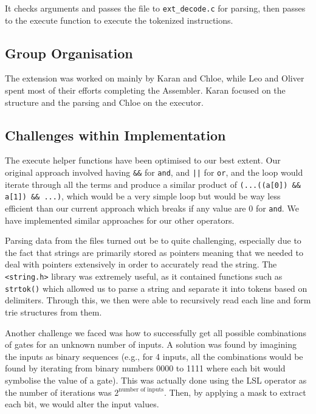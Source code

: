 \documentclass[11pt]{article}
\begin{document}
It checks arguments and passes the file to \texttt{ext\_decode.c} for parsing, then passes to the execute function to execute the tokenized instructions.

\subsection{Group Organisation}

The extension was worked on mainly by Karan and Chloe, while Leo and Oliver spent most of their efforts completing the Assembler. Karan focused on the structure and the parsing and Chloe on the executor.

\subsection{Challenges within Implementation}

The execute helper functions have been optimised to our best extent. Our original approach involved having \texttt{\&\&} for \texttt{and}, and \texttt{||} for \texttt{or}, and the loop would iterate through all the terms and produce a similar product of \texttt{(...((a[0]) \&\& a[1]) \&\& ...)}, which would be a very simple loop but would be way less efficient than our current approach which breaks if any value are 0 for \texttt{and}. We have implemented similar approaches for our other operators.

Parsing data from the files turned out be to quite challenging, especially due to the fact that strings are primarily stored as pointers meaning that we needed to deal with pointers extensively in order to accurately read the string. The \texttt{<string.h>} library was extremely useful, as it contained functions such as \texttt{strtok()} which allowed us to parse a string and separate it into tokens based on delimiters. Through this, we then were able to recursively read each line and form trie structures from them.

Another challenge we faced was how to successfully get all possible combinations of gates for an unknown number of inputs. A solution was found by imagining the inputs as binary sequences (e.g., for 4 inputs, all the combinations would be found by iterating from binary numbers 0000 to 1111 where each bit would symbolise the value of a gate). This was actually done using the LSL operator as the number of iterations was $2^{\textrm{number of inputs}}$. Then, by applying a mask to extract each bit, we would alter the input values.
\end{document}
